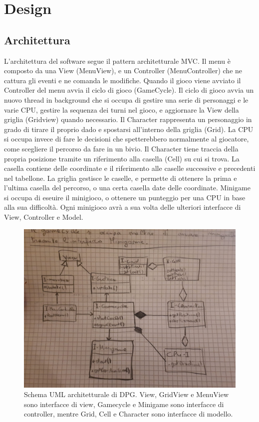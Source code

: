 \documentclass[a4paper,12pt]{report}
\begin{document}
	\chapter{Design}

	\section{Architettura}

	L'architettura del software segue il pattern architetturale MVC.
	Il menu è composto da una View (MenuView), e un Controller (MenuController) che ne cattura gli eventi e ne comanda le modifiche.
	Quando il gioco viene avviato il Controller del menu avvia il ciclo di gioco (GameCycle).
	Il ciclo di gioco avvia un nuovo thread in background che si occupa di gestire una serie di personaggi e le varie CPU, gestire la sequenza dei turni nel gioco, e aggiornare la View della griglia (Gridview) quando necessario.
	Il Character rappresenta un personaggio in grado di tirare il proprio dado e spostarsi all'interno della griglia (Grid).
	La CPU si occupa invece di fare le decisioni che spetterebbero normalmente al giocatore, come scegliere il percorso da fare in un bivio.
	Il Character tiene traccia della propria posizione tramite un riferimento alla casella (Cell) su cui si trova.
	La casella contiene delle coordinate e il riferimento alle caselle successive e precedenti nel tabellone.
	La griglia gestisce le caselle, e permette di ottenere la prima e l'ultima casella del percorso, o una certa casella date delle coordinate.
	Minigame si occupa di eseuire il minigioco, o ottenere un punteggio per una CPU in base alla sua difficoltà.
	Ogni minigioco avrà a sua volta delle ulteriori interfacce di View, Controller e Model.

	\begin{figure}[!t]
		\centering{}
		\includegraphics[width=\textwidth]{images/arch.jpeg}
		\caption{Schema UML architetturale di DPG. View, GridView e MenuView sono interfacce di view, Gamecycle e Minigame sono interfacce di controller, mentre Grid, Cell e Character sono interfacce di modello.}
		\label{img:goodarch}
	\end{figure}
\end{document}
